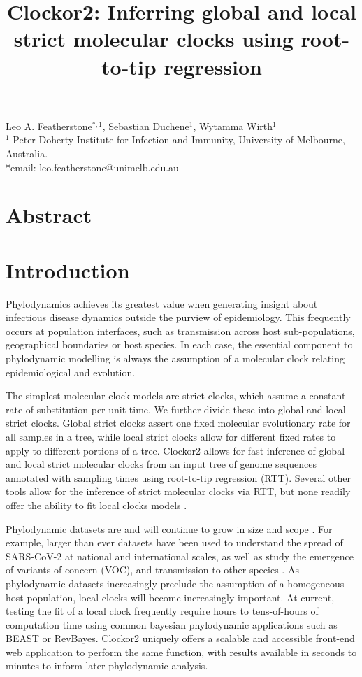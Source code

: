 \documentclass{article}
\title{Clockor2:  Inferring global and local strict molecular clocks using root-to-tip regression}
\begin{document}
\maketitle
\begin{centering}
Leo A. Featherstone$^{\ast,1}$, Sebastian Duchene$^1$, Wytamma Wirth$^{1}$\\
$^{1}$ Peter Doherty Institute for Infection and Immunity, University of Melbourne, Australia.\\
*email: leo.featherstone@unimelb.edu.au
\end{centering}

\section*{Abstract}


\section*{Introduction}
Phylodynamics achieves its greatest value when generating insight about infectious disease dynamics outside the purview of epidemiology. This frequently occurs at population interfaces, such as transmission across host sub-populations,  geographical boundaries or host species. In each case, the essential component to phylodynamic modelling is always the assumption of a molecular clock relating epidemiological and evolution.

The simplest molecular clock models are strict clocks, which assume a constant rate of substitution per unit time. We further divide these into global and local strict clocks. Global strict clocks assert one fixed molecular evolutionary rate for all samples in a tree, while local strict clocks allow for different fixed rates to apply to different portions of a tree. Clockor2 allows for fast inference of global and local strict molecular clocks from an input tree of genome sequences annotated with sampling times using root-to-tip regression (RTT). Several other tools allow for the inference of strict molecular clocks via RTT, but none readily offer the ability to fit local clocks models \citep{rambaut_exploring_2016, hadfield_nextstrain_2018,sagulenko_treetime_2018,volz_scalable_2017}. 

Phylodynamic datasets are and will continue to grow in size and scope \cite{featherstone2022epidemiological}. For example, larger than ever datasets have been used to understand the spread of SARS-CoV-2 at national and international scales, as well as study the emergence of variants of concern (VOC), and transmission to other species \citep{du_plessis_establishment_2021,hill_origins_2022,nadeau_swiss_2023,porter2023evolutionary}. As phylodynamic datasets increasingly preclude the assumption of a homogeneous host population, local clocks will become increasingly important. At current, testing the fit of a local clock frequently require hours to tens-of-hours of computation time using common bayesian phylodynamic applications such as BEAST or RevBayes. Clockor2 uniquely offers a scalable and accessible front-end web application to perform the same function, with results available in seconds to minutes to inform later phylodynamic analysis.
\end{document}
